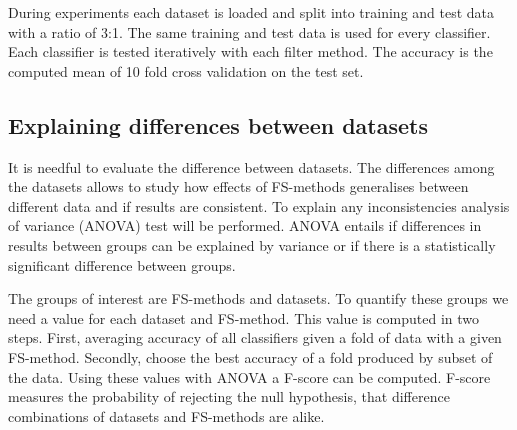 During experiments each dataset is loaded and split into training and test data with a ratio of 3:1. The same training and test data is used for every classifier. Each classifier is tested iteratively with each filter method. The accuracy is the computed mean of 10 fold cross validation on the test set.

\subsection{Explaining differences between datasets}

It is needful to evaluate the difference between datasets. The differences among the datasets allows to study how effects of FS-methods generalises between different data and if results are consistent. To explain any inconsistencies analysis of variance (ANOVA) test will be performed. ANOVA entails if differences in results between groups can be explained by variance or if there is a statistically significant difference between groups.

The groups of interest are FS-methods and datasets. To quantify these groups we need a value for each dataset and FS-method. This value is computed in two steps. First, averaging accuracy of all classifiers given a fold of data with a given FS-method. Secondly, choose the best accuracy of a fold produced by subset of the data. Using these values with ANOVA a F-score can be computed. F-score measures the probability of rejecting the null hypothesis, that difference combinations of datasets and FS-methods are alike.

